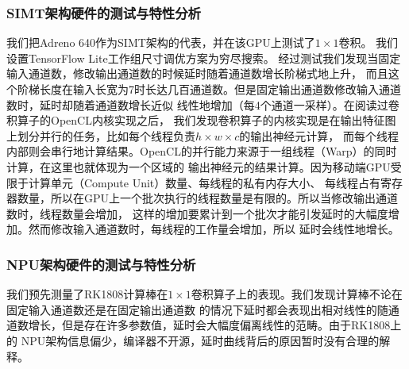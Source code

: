 \subsubsection{SIMT架构硬件的测试与特性分析}
我们把Adreno 640作为SIMT架构的代表，并在该GPU上测试了$1\times 1$卷积。
我们设置TensorFlow Lite工作组尺寸调优方案为穷尽搜索。
经过测试我们发现当固定输入通道数，修改输出通道数的时候延时随着通道数增长阶梯式地上升，
而且这个阶梯长度在输入长宽为7时长达几百通道数。但是固定输出通道数修改输入通道数时，延时却随着通道数增长近似
线性地增加（每4个通道一采样）。在阅读过卷积算子的OpenCL内核实现之后，
我们发现卷积算子的内核实现是在输出特征图上划分并行的任务，比如每个线程负责$h\times w\times c$的输出神经元计算，
而每个线程内部则会串行地计算结果。OpenCL的并行能力来源于一组线程（Warp）的同时计算，在这里也就体现为一个区域的
输出神经元的结果计算。因为移动端GPU受限于计算单元（Compute Unit）数量、每线程的私有内存大小、
每线程占有寄存器数量，所以在GPU上一个批次执行的线程数量是有限的。所以当修改输出通道数时，线程数量会增加，
这样的增加要累计到一个批次才能引发延时的大幅度增加。然而修改输入通道数时，每线程的工作量会增加，所以
延时会线性地增长。

\subsubsection{NPU架构硬件的测试与特性分析}
我们预先测量了RK1808计算棒在$1\times 1$卷积算子上的表现。我们发现计算棒不论在固定输入通道数还是在固定输出通道数
的情况下延时都会表现出相对线性的随通道数增长，但是存在许多参数值，延时会大幅度偏离线性的范畴。由于RK1808上的
NPU架构信息偏少，编译器不开源，延时曲线背后的原因暂时没有合理的解释。